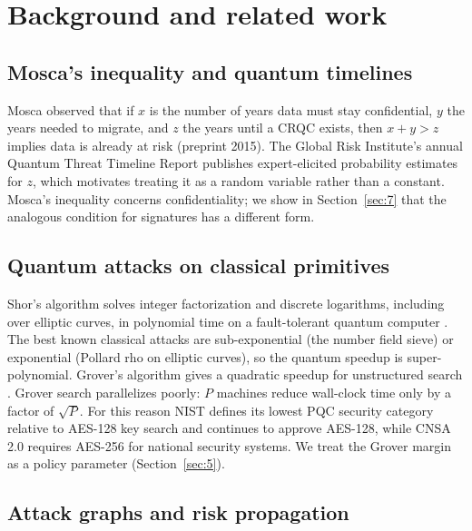 \documentclass[conference]{IEEEtran}
\begin{document}
\section{Background and related work}\label{sec:2}

\subsection{Mosca's inequality and quantum timelines}\label{sec:2.1}

Mosca observed that if $x$ is the number of years data must stay confidential, $y$ the years needed to migrate, and $z$ the years until a CRQC exists, then $x + y > z$ implies data is already at risk \cite{mosca2018} (preprint 2015). The Global Risk Institute's annual Quantum Threat Timeline Report \cite{mosca} publishes expert-elicited probability estimates for $z$, which motivates treating it as a random variable rather than a constant. Mosca's inequality concerns confidentiality; we show in Section~\ref{sec:7} that the analogous condition for signatures has a different form.

\subsection{Quantum attacks on classical primitives}\label{sec:2.2}

Shor's algorithm solves integer factorization and discrete logarithms, including over elliptic curves, in polynomial time on a fault-tolerant quantum computer \cite{shor1997}. The best known classical attacks are sub-exponential (the number field sieve) or exponential (Pollard rho on elliptic curves), so the quantum speedup is super-polynomial. Grover's algorithm gives a quadratic speedup for unstructured search \cite{grover1996}. Grover search parallelizes poorly: $P$ machines reduce wall-clock time only by a factor of $\sqrt{P}$. For this reason NIST defines its lowest PQC security category relative to AES-128 key search and continues to approve AES-128, while CNSA 2.0 requires AES-256 for national security systems. We treat the Grover margin as a policy parameter (Section~\ref{sec:5}).

\subsection{Attack graphs and risk propagation}\label{sec:2.3}
\end{document}
